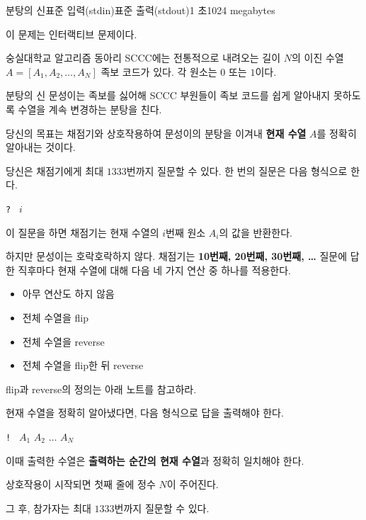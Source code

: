 \def\probtitle{분탕의 신}
\def\probno{I} %

\begin{problem}{\probtitle}{표준 입력(stdin)}{표준 출력(stdout)}{1 초}{1024 megabytes}

이 문제는 인터랙티브 문제이다.

숭실대학교 알고리즘 동아리 SCCC에는 전통적으로 내려오는 길이 $N$의 이진 수열 $A = [A_1, A_2, \dots, A_N]$ 족보 코드가 있다. 각 원소는 $0$ 또는 $1$이다.

분탕의 신 문성이는 족보를 싫어해 SCCC 부원들이 족보 코드를 쉽게 알아내지 못하도록 수열을 계속 변경하는 분탕을 친다.

당신의 목표는 채점기와 상호작용하여 문성이의 분탕을 이겨내 \textbf{현재 수열} $A$를 정확히 알아내는 것이다.

당신은 채점기에게 최대 $1333$번까지 질문할 수 있다.
한 번의 질문은 다음 형식으로 한다.
\begin{center}
\texttt{? } $i$
\end{center}

이 질문을 하면 채점기는 현재 수열의 $i$번째 원소 $A_i$의 값을 반환한다.

하지만 문성이는 호락호락하지 않다.
채점기는 \textbf{10번째, 20번째, 30번째, \dots} 질문에 답한 직후마다 현재 수열에 대해 다음 네 가지 연산 중 하나를 적용한다.
\begin{itemize}[topsep=0pt,noitemsep] 
    \item 아무 연산도 하지 않음
    \item 전체 수열을 flip
    \item 전체 수열을 reverse
    \item 전체 수열을 flip한 뒤 reverse
\end{itemize}

flip과 reverse의 정의는 아래 노트를 참고하라.

현재 수열을 정확히 알아냈다면, 다음 형식으로 답을 출력해야 한다.
\begin{center}
\texttt{! } $A_1$ $A_2$ $\dots$ $A_N$
\end{center}

이때 출력한 수열은 \textbf{출력하는 순간의 현재 수열}과 정확히 일치해야 한다.

\newpage

\Interaction

상호작용이 시작되면 첫째 줄에 정수 $N$이 주어진다.

그 후, 참가자는 최대 $1333$번까지 질문할 수 있다.


\end{problem}
